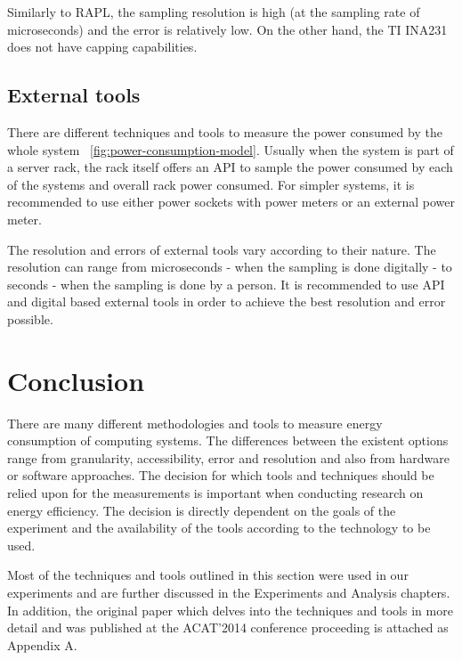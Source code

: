 Similarly to RAPL, the sampling resolution is high (at the sampling rate of microseconds) and the error is relatively low. On the other hand, the TI INA231 does not have capping capabilities.


\subsection*{External tools}

There are different techniques and tools to measure the power consumed by the whole system ~\ref{fig:power-consumption-model}. Usually when the system is part of a server rack, the rack itself offers an API to sample the power consumed by each of the systems and overall rack power consumed. For simpler systems, it is recommended to use either power sockets with power meters or an external power meter. 

The resolution and errors of external tools vary according to their nature. The resolution can range from microseconds - when the sampling is done digitally - to seconds - when the sampling is done by a person. It is recommended to use API and digital based external tools in order to achieve the best resolution and error possible. 


\section*{Conclusion}
There are many different methodologies and tools to measure energy consumption of computing systems. The differences between the existent options range from granularity, accessibility, error and resolution and also from hardware or software approaches. The decision for which tools and techniques should be relied upon for the measurements is important when conducting research on energy efficiency. The decision is directly dependent on the goals of the experiment and the availability of the tools according to the technology to be used. 

Most of the techniques and tools outlined in this section were used in our experiments and are further discussed in the Experiments and Analysis chapters. In addition, the original paper which delves into the techniques and tools in more detail and was published at the ACAT'2014 conference proceeding is attached as Appendix A.